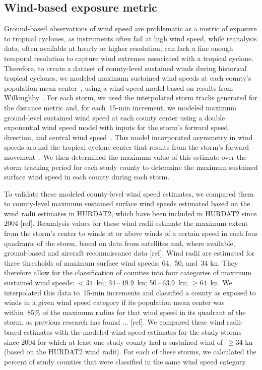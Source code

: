 \subsection*{Wind-based exposure metric}

Ground-based observations of wind speed are problematic as a metric of exposure
to tropical cyclones, as instruments often fail at high wind speed, while
reanalysis data, often available at hourly or higher resolution, can lack a
fine enough temporal resolution to capture wind extremes associated with a
tropical cyclone. Therefore, to create a dataset of county-level sustained
winds during historical tropical cyclones, we modeled maximum sustained wind
speeds at each county's population mean center~\parencite{countycenters}, using
a wind speed model based on results from
Willoughby~\parencite{willoughby2006parametric}. For each storm, we used the
interpolated storm tracks generated for the distance metric and, for
each~15-\si{\minute} increment, we modeled maximum ground-level sustained wind
speed at each county center using a double exponential wind speed model with
inputs for the storm's forward speed, direction, and central wind
speed~\parencite{willoughby2006parametric, stormwindmodel}. This model
incorporated asymmetry in wind speeds around the tropical cyclone center that
results from the storm's forward movement~\parencite{phadke2003modeling,
stormwindmodel}. We then determined the maximum value of this estimate over the
storm tracking period for each study county to determine the maximum sustained
surface wind speed in each county during each storm.

To validate these modeled county-level wind speed estimates, we compared them
to county-level maximum sustained surface wind speeds estimated based on the
wind radii estimates in \ac{HURDAT2}, which have been included in \ac{HURDAT2}
since 2004 [ref]. Reanalysis values for these wind radii estimate the maximum
extent from the storm's center to winds at or above winds of a certain speed in
each four quadrants of the storm, based on data from satellites and, where
available, ground-based and aircraft reconnaissance data [ref].  Wind radii are
estimated for three thresholds of maximum surface wind speeds: 64,~50, and~34
\si{\knot}.  They therefore allow for the classification of counties into four
categories of maximum sustained wind speeds: $<$34~\si{\knot};
34\,--\,49.9~\si{\knot}; 50\,--\,63.9~\si{\knot}; $\ge$64~\si{\knot}. We
interpolated this data to~15-\si{\minute} increments and classified a county as
exposed to winds in a given wind speed category if its population mean center
was within~85\% of the maximum radius for that wind speed in its quadrant of
the storm, as previous research has found  ... [ref]. We compared these wind
radii-based estimates with the modeled wind speed estimates for the study
storms since 2004 for which at least one study county had a sustained wind
of~$\ge$34 \si{\knot} (based on the \ac{HURDAT2} wind radii). For each of these
storms, we calculated the percent of study counties that were classified in the
same wind speed category.

